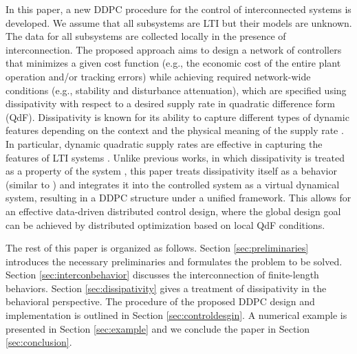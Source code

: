 \documentclass[11pt,print,draftcls,onecolumn,romanappendices]{ieeecolor}
\newcommand{\revise}[1]{{\color{black} #1}}
\begin{document}
In this paper, a new DDPC procedure for the control of interconnected systems is developed. We assume that all subsystems are LTI but their models are unknown. The data for all subsystems are collected locally \revise{in} the presence of interconnection. The proposed approach aims to design a network of controllers that minimizes a given cost function (e.g., the economic cost of the entire plant operation and/or tracking errors) while achieving required network-wide conditions (e.g., stability and disturbance attenuation), which are specified using dissipativity with respect to a desired supply rate in quadratic difference form (QdF). Dissipativity is known for its ability to capture different types of dynamic features depending on the context and the physical meaning of the supply rate \cite{Willems:1972}. In particular, dynamic quadratic supply rates are effective in capturing the features of LTI systems \cite{Willems:1998,Kojima:2005, Tippett:2013}. \revise{Unlike previous works, in which dissipativity is treated as a property of the system \cite{Tippett:2013,Tippett:2014,Yan:2019},} this paper treats dissipativity itself as a behavior (similar to \cite{Willems:2007a}) and integrates it into the controlled system as a virtual dynamical system, resulting in a DDPC structure under a unified framework. \revise{This allows for an effective data-driven distributed control design, where the global design goal can be achieved by  distributed optimization based on local QdF conditions.}

The rest of this paper is organized as follows. Section \ref{sec:preliminaries} introduces the necessary preliminaries and formulates the problem to be solved. Section \ref{sec:interconbehavior} discusses the interconnection of finite-length behaviors. Section \ref{sec:dissipativity} gives a treatment of dissipativity in the behavioral perspective. The procedure of the proposed DDPC design and implementation is outlined in Section \ref{sec:controldesgin}. A numerical example is presented in Section \ref{sec:example} and we conclude the paper in Section \ref{sec:conclusion}.
\end{document}
